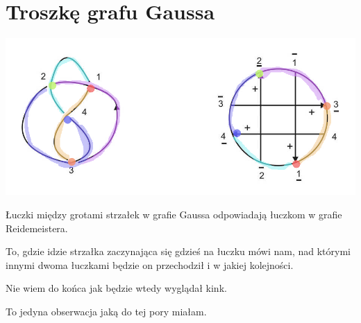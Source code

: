 \section{Troszkę grafu Gaussa}

\begin{center}
  \includegraphics[width=\textwidth]{./rozdzialy/gauss_test.png}
\end{center}

Łuczki między grotami strzałek w grafie Gaussa odpowiadają łuczkom w grafie Reidemeistera.

To, gdzie idzie strzałka zaczynająca się gdzieś na łuczku mówi nam, nad którymi innymi dwoma łuczkami będzie on przechodził i w jakiej kolejności.

Nie wiem do końca jak będzie wtedy wyglądał kink.

To jedyna obserwacja jaką do tej pory miałam.
